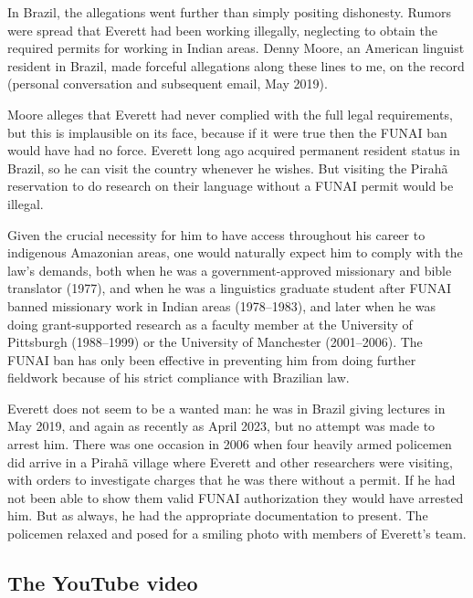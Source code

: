 \documentclass[output=paper,colorlinks,citecolor=brown
]{langscibook}
\begin{document}
In Brazil, the allegations went further than simply positing
dishonesty. Rumors were spread that Everett had been working
illegally, neglecting to obtain the required permits for working in
Indian areas. Denny Moore, an American linguist resident in Brazil,
made forceful allegations along these lines to me, on the record
(personal conversation and subsequent email, May 2019).

Moore alleges that Everett had never complied with the full legal
requirements, but this is implausible on its face, because if it were
true then the FUNAI ban would have had no force. Everett long ago
acquired permanent resident status in Brazil, so he can visit the
country whenever he wishes. But visiting the Pirahã reservation
to do research on their language without a FUNAI permit would be
illegal.

Given the crucial necessity for him to have access throughout his
career to indigenous Amazonian areas, one would naturally expect him
to comply with the law's demands, both when he was a government-approved
missionary and bible translator (1977), and when he was a linguistics
graduate student after FUNAI banned missionary work in Indian areas
(1978--1983), and later when he was doing grant-supported research as
a faculty member at the University of Pittsburgh (1988--1999) or the
University of Manchester (2001--2006). The FUNAI ban has only been
effective in preventing him from doing further fieldwork because of
his strict compliance with Brazilian law.

Everett does not seem to be a wanted man: he was in Brazil giving
lectures in May 2019, and again as recently as April 2023, but no
attempt was made to arrest him. There was one occasion in 2006 when
four heavily armed policemen did arrive in a Pirahã village
where Everett and other researchers were visiting, with orders to
investigate charges that he was there without a permit. If he had
not been able to show them valid FUNAI authorization they would
have arrested him. But as always, he had the appropriate documentation
to present. The policemen relaxed and posed for a smiling photo with
members of Everett's team.

\subsection{The YouTube video}
\end{document}
